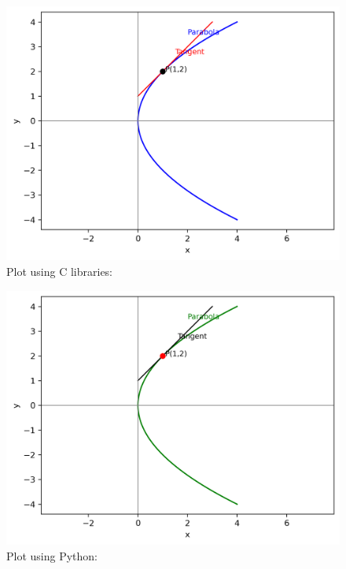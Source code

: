 \documentclass{beamer}
\numberwithin{equation}{section}
\begin{document}
\begin{figure}[H]
	\centering
	\includegraphics[scale=0.5]{img1}
	\caption*{Plot using C libraries:}
	\label{img1}
\end{figure}
\begin{figure}[H]
	\centering
	\includegraphics[scale=0.5]{img2}
	\caption*{
		Plot using Python:}
	\label{img2}
\end{figure}
\end{document}
